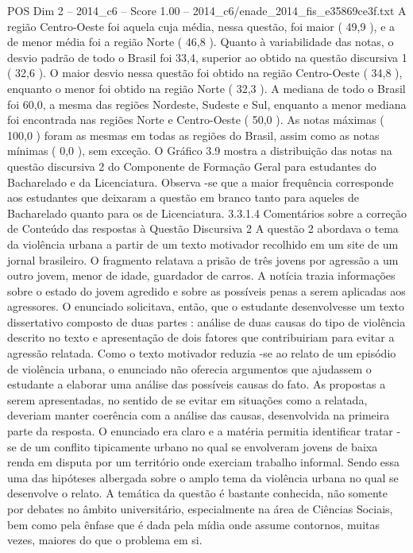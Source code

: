 \begin{textsample}{POS Dim 2 – 2014\_c6 – Score 1.00 – 2014\_c6/enade\_2014\_fis\_e35869ce3f.txt}
A região Centro-Oeste foi aquela cuja média, nessa questão, foi maior ( 49,9 ), e a de menor média foi a região Norte ( 46,8 ).
Quanto à variabilidade das notas, o desvio padrão de todo o Brasil foi 33,4, superior ao obtido na questão discursiva 1 ( 32,6 ).
O maior desvio nessa questão foi obtido na região Centro-Oeste ( 34,8 ), enquanto o menor foi obtido na região Norte ( 32,3 ).
A mediana de todo o Brasil foi 60,0, a mesma das regiões Nordeste, Sudeste e Sul, enquanto a menor mediana foi encontrada nas regiões Norte e Centro-Oeste ( 50,0 ).
As notas máximas ( 100,0 ) foram as mesmas em todas as regiões do Brasil, assim como as notas mínimas ( 0,0 ), sem exceção.
O Gráfico 3.9 mostra a distribuição das notas na questão discursiva 2 do Componente de Formação Geral para estudantes do Bacharelado e da Licenciatura.
Observa -se que a maior frequência corresponde aos estudantes que deixaram a questão em branco tanto para aqueles de Bacharelado quanto para os de Licenciatura. 3.3.1.4 Comentários sobre a correção de Conteúdo das respostas à Questão Discursiva 2 A questão 2 abordava o tema da violência urbana a partir de um texto motivador recolhido em um site de um jornal brasileiro.
O fragmento relatava a prisão de três jovens por agressão a um outro jovem, menor de idade, guardador de carros.
A notícia trazia informações sobre o estado do jovem agredido e sobre as possíveis penas a serem aplicadas aos agressores.
O enunciado solicitava, então, que o estudante desenvolvesse um texto dissertativo composto de duas partes : análise de duas causas do tipo de violência descrito no texto e apresentação de dois fatores que contribuiriam para evitar a agressão relatada.
Como o texto motivador reduzia -se ao relato de um episódio de violência urbana, o enunciado não oferecia argumentos que ajudassem o estudante a elaborar uma análise das possíveis causas do fato.
As propostas a serem apresentadas, no sentido de se evitar em situações como a relatada, deveriam manter coerência com a análise das causas, desenvolvida na primeira parte da resposta.
O enunciado era claro e a matéria permitia identificar tratar -se de um conflito tipicamente urbano no qual se envolveram jovens de baixa renda em disputa por um território onde exerciam trabalho informal.
Sendo essa uma das hipóteses albergada sobre o amplo tema da violência urbana no qual se desenvolve o relato.
A temática da questão é bastante conhecida, não somente por debates no âmbito universitário, especialmente na área de Ciências Sociais, bem como pela ênfase que é dada pela mídia onde assume contornos, muitas vezes, maiores do que o problema em si.

\end{textsample}
